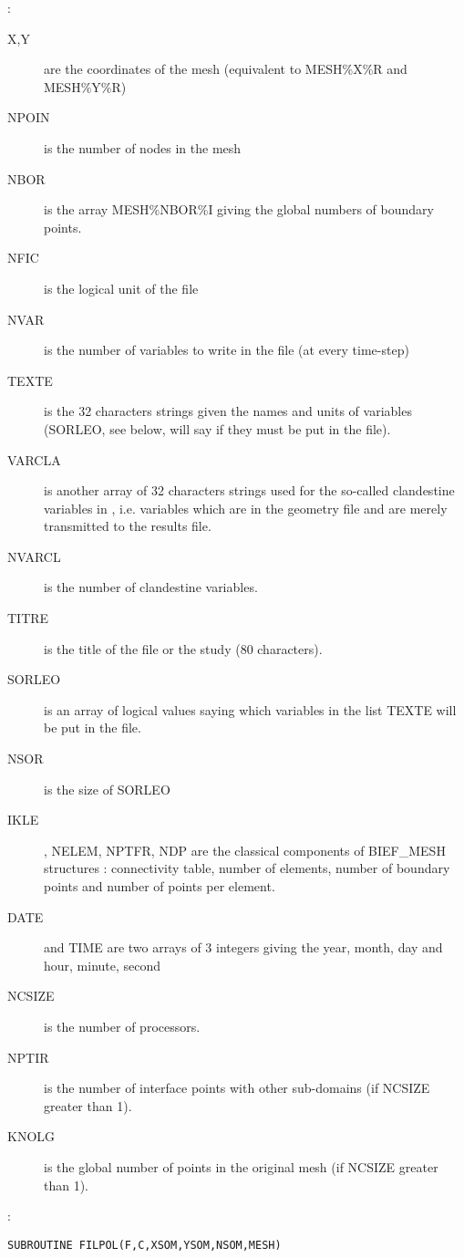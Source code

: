 :
\begin{description}
  \item [X,Y] are the coordinates of the mesh (equivalent to MESH\%X\%R and MESH\%Y\%R)
  \item [NPOIN] is the number of nodes in the mesh
  \item [NBOR] is the array MESH\%NBOR\%I giving the global numbers of boundary points.
  \item [NFIC] is the logical unit of the file
  \item [NVAR] is the number of variables to write in the file (at every time-step)
  \item [TEXTE] is the 32 characters strings given the names and units of
    variables (SORLEO, see below, will say if they must be put in the file).
  \item [VARCLA] is another array of 32 characters strings used for the
    so-called clandestine variables in , i.e. variables which are
    in the geometry file and are merely transmitted to the results file.
  \item [NVARCL] is the number of clandestine variables.
  \item [TITRE] is the title of the file or the study (80 characters).
  \item [SORLEO] is an array of logical values saying which variables in the
    list TEXTE will be put in the file.
  \item [NSOR] is the size of SORLEO
  \item [IKLE], NELEM, NPTFR, NDP are the classical components of BIEF\_MESH
    structures : connectivity table, number of elements, number of boundary
    points and number of points per element.
  \item [DATE] and TIME are two arrays of 3 integers giving the year, month,
    day and hour, minute, second
  \item [NCSIZE] is the number of processors.
  \item [NPTIR] is the number of interface points with other sub-domains (if NCSIZE greater than 1).
  \item [KNOLG] is the global number of points in the original mesh (if NCSIZE greater than 1).
\end{description}

:
\begin{lstlisting}[language=TelFortran]
SUBROUTINE FILPOL(F,C,XSOM,YSOM,NSOM,MESH)
\end{lstlisting}

